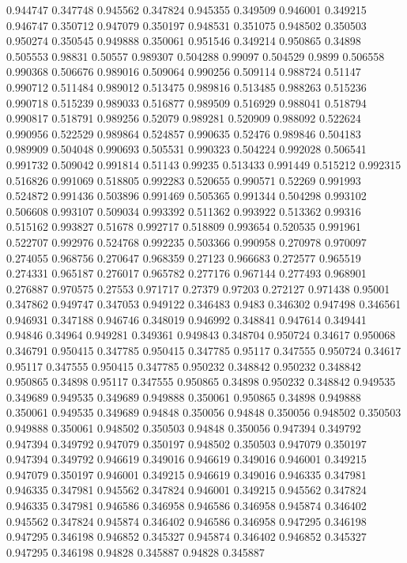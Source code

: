 0.944747 0.347748
0.945562 0.347824
0.945355 0.349509
0.946001 0.349215
0.946747 0.350712
0.947079 0.350197
0.948531 0.351075
0.948502 0.350503
0.950274 0.350545
0.949888 0.350061
0.951546 0.349214
0.950865 0.34898
0.505553 0.98831
0.50557 0.989307
0.504288 0.99097
0.504529 0.9899
0.506558 0.990368
0.506676 0.989016
0.509064 0.990256
0.509114 0.988724
0.51147 0.990712
0.511484 0.989012
0.513475 0.989816
0.513485 0.988263
0.515236 0.990718
0.515239 0.989033
0.516877 0.989509
0.516929 0.988041
0.518794 0.990817
0.518791 0.989256
0.52079 0.989281
0.520909 0.988092
0.522624 0.990956
0.522529 0.989864
0.524857 0.990635
0.52476 0.989846
0.504183 0.989909
0.504048 0.990693
0.505531 0.990323
0.504224 0.992028
0.506541 0.991732
0.509042 0.991814
0.51143 0.99235
0.513433 0.991449
0.515212 0.992315
0.516826 0.991069
0.518805 0.992283
0.520655 0.990571
0.52269 0.991993
0.524872 0.991436
0.503896 0.991469
0.505365 0.991344
0.504298 0.993102
0.506608 0.993107
0.509034 0.993392
0.511362 0.993922
0.513362 0.99316
0.515162 0.993827
0.51678 0.992717
0.518809 0.993654
0.520535 0.991961
0.522707 0.992976
0.524768 0.992235
0.503366 0.990958
0.270978 0.970097
0.274055 0.968756
0.270647 0.968359
0.27123 0.966683
0.272577 0.965519
0.274331 0.965187
0.276017 0.965782
0.277176 0.967144
0.277493 0.968901
0.276887 0.970575
0.27553 0.971717
0.27379 0.97203
0.272127 0.971438
0.95001 0.347862
0.949747 0.347053
0.949122 0.346483
0.9483 0.346302
0.947498 0.346561
0.946931 0.347188
0.946746 0.348019
0.946992 0.348841
0.947614 0.349441
0.94846 0.34964
0.949281 0.349361
0.949843 0.348704
0.950724 0.34617
0.950068 0.346791
0.950415 0.347785
0.950415 0.347785
0.95117 0.347555
0.950724 0.34617
0.95117 0.347555
0.950415 0.347785
0.950232 0.348842
0.950232 0.348842
0.950865 0.34898
0.95117 0.347555
0.950865 0.34898
0.950232 0.348842
0.949535 0.349689
0.949535 0.349689
0.949888 0.350061
0.950865 0.34898
0.949888 0.350061
0.949535 0.349689
0.94848 0.350056
0.94848 0.350056
0.948502 0.350503
0.949888 0.350061
0.948502 0.350503
0.94848 0.350056
0.947394 0.349792
0.947394 0.349792
0.947079 0.350197
0.948502 0.350503
0.947079 0.350197
0.947394 0.349792
0.946619 0.349016
0.946619 0.349016
0.946001 0.349215
0.947079 0.350197
0.946001 0.349215
0.946619 0.349016
0.946335 0.347981
0.946335 0.347981
0.945562 0.347824
0.946001 0.349215
0.945562 0.347824
0.946335 0.347981
0.946586 0.346958
0.946586 0.346958
0.945874 0.346402
0.945562 0.347824
0.945874 0.346402
0.946586 0.346958
0.947295 0.346198
0.947295 0.346198
0.946852 0.345327
0.945874 0.346402
0.946852 0.345327
0.947295 0.346198
0.94828 0.345887
0.94828 0.345887
